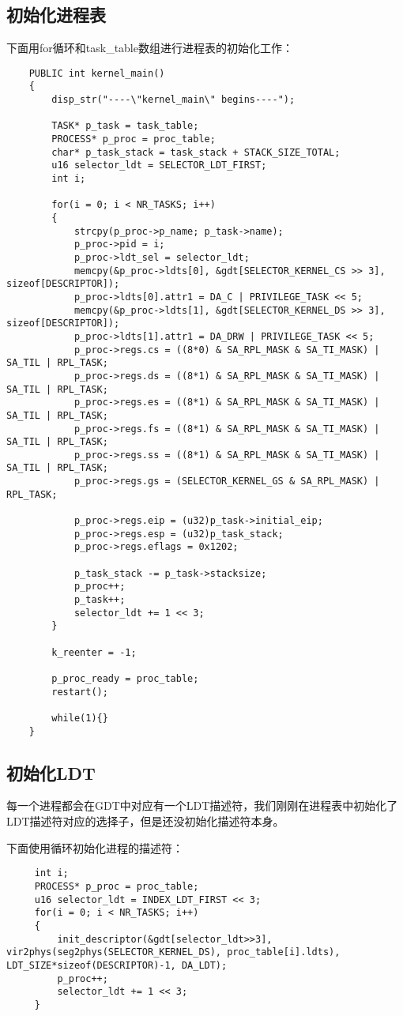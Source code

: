 \documentclass[a4paper,left=2.5cm,right=2.5cm,11pt]{report}
\begin{document}
\subsection{初始化进程表}
	下面用for循环和task\_table数组进行进程表的初始化工作：
	\begin{lstlisting}
	PUBLIC int kernel_main()
	{
		disp_str("----\"kernel_main\" begins----");

		TASK* p_task = task_table;
		PROCESS* p_proc = proc_table;
		char* p_task_stack = task_stack + STACK_SIZE_TOTAL;
		u16 selector_ldt = SELECTOR_LDT_FIRST;
		int i;

		for(i = 0; i < NR_TASKS; i++)
		{
			strcpy(p_proc->p_name; p_task->name);
			p_proc->pid = i;
			p_proc->ldt_sel = selector_ldt;
			memcpy(&p_proc->ldts[0], &gdt[SELECTOR_KERNEL_CS >> 3], sizeof[DESCRIPTOR]);
			p_proc->ldts[0].attr1 = DA_C | PRIVILEGE_TASK << 5;
			memcpy(&p_proc->ldts[1], &gdt[SELECTOR_KERNEL_DS >> 3], sizeof[DESCRIPTOR]);
			p_proc->ldts[1].attr1 = DA_DRW | PRIVILEGE_TASK << 5;
			p_proc->regs.cs = ((8*0) & SA_RPL_MASK & SA_TI_MASK) | SA_TIL | RPL_TASK;
			p_proc->regs.ds = ((8*1) & SA_RPL_MASK & SA_TI_MASK) | SA_TIL | RPL_TASK;
			p_proc->regs.es = ((8*1) & SA_RPL_MASK & SA_TI_MASK) | SA_TIL | RPL_TASK;
			p_proc->regs.fs = ((8*1) & SA_RPL_MASK & SA_TI_MASK) | SA_TIL | RPL_TASK;
			p_proc->regs.ss = ((8*1) & SA_RPL_MASK & SA_TI_MASK) | SA_TIL | RPL_TASK;
			p_proc->regs.gs = (SELECTOR_KERNEL_GS & SA_RPL_MASK) | RPL_TASK;

			p_proc->regs.eip = (u32)p_task->initial_eip;
			p_proc->regs.esp = (u32)p_task_stack;
			p_proc->regs.eflags = 0x1202;

			p_task_stack -= p_task->stacksize;
			p_proc++;
			p_task++;
			selector_ldt += 1 << 3;
		}

		k_reenter = -1;

		p_proc_ready = proc_table;
		restart();

		while(1){}
	}
	\end{lstlisting}

\subsection{初始化LDT}
	 每一个进程都会在GDT中对应有一个LDT描述符，我们刚刚在进程表中初始化了LDT描述符对应的选择子，但是还没初始化描述符本身。\par

	 下面使用循环初始化进程的描述符：
	 \begin{lstlisting}
	 int i;
	 PROCESS* p_proc = proc_table;
	 u16 selector_ldt = INDEX_LDT_FIRST << 3;
	 for(i = 0; i < NR_TASKS; i++)
	 {
		 init_descriptor(&gdt[selector_ldt>>3], vir2phys(seg2phys(SELECTOR_KERNEL_DS), proc_table[i].ldts), LDT_SIZE*sizeof(DESCRIPTOR)-1, DA_LDT);
		 p_proc++;
		 selector_ldt += 1 << 3;
	 }
	 \end{lstlisting}
\end{document}
